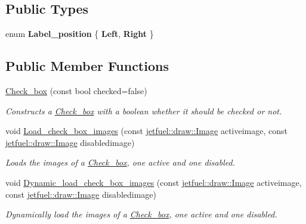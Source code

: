 \subsection*{Public Types}
\begin{DoxyCompactItemize}
\item 
\mbox{\label{classjetfuel_1_1gui_1_1Check__box_ad5ad16e0235bc83f4025df31fc554cc0}} 
enum {\bfseries Label\+\_\+position} \{ {\bfseries Left}, 
{\bfseries Right}
 \}
\end{DoxyCompactItemize}
\subsection*{Public Member Functions}
\begin{DoxyCompactItemize}
\item 
\hyperlink{classjetfuel_1_1gui_1_1Check__box_a1e0e07940cfa643c1f019830042553bd}{Check\+\_\+box} (const bool checked=false)
\begin{DoxyCompactList}\small\item\em Constructs a \hyperlink{classjetfuel_1_1gui_1_1Check__box}{Check\+\_\+box} with a boolean whether it should be checked or not. \end{DoxyCompactList}\item 
void \hyperlink{classjetfuel_1_1gui_1_1Check__box_adadc280e5d14f08e64f974ba9156cd16}{Load\+\_\+check\+\_\+box\+\_\+images} (const \hyperlink{classjetfuel_1_1draw_1_1Image}{jetfuel\+::draw\+::\+Image} activeimage, const \hyperlink{classjetfuel_1_1draw_1_1Image}{jetfuel\+::draw\+::\+Image} disabledimage)
\begin{DoxyCompactList}\small\item\em Loads the images of a \hyperlink{classjetfuel_1_1gui_1_1Check__box}{Check\+\_\+box}, one active and one disabled. \end{DoxyCompactList}\item 
void \hyperlink{classjetfuel_1_1gui_1_1Check__box_a9fd8ee85ef4f17195fbb7bcf53e061dc}{Dynamic\+\_\+load\+\_\+check\+\_\+box\+\_\+images} (const \hyperlink{classjetfuel_1_1draw_1_1Image}{jetfuel\+::draw\+::\+Image} activeimage, const \hyperlink{classjetfuel_1_1draw_1_1Image}{jetfuel\+::draw\+::\+Image} disabledimage)
\begin{DoxyCompactList}\small\item\em Dynamically load the images of a \hyperlink{classjetfuel_1_1gui_1_1Check__box}{Check\+\_\+box}, one active and one disabled. \end{DoxyCompactList}\item 

\end{DoxyCompactItemize}
